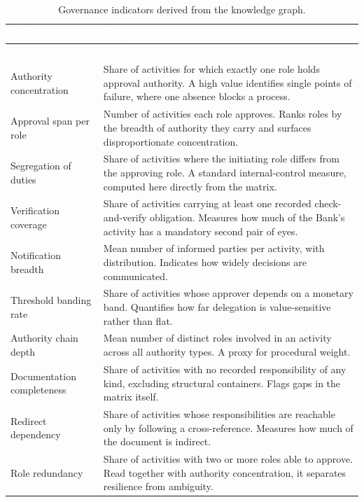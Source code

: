 \begin{longtable}{|p{}|p{}|}
\caption{Governance indicators derived from the knowledge graph.}\label{tab:govkpi}\\
\hline
\rowcolor{myblue}\textcolor{white}{\textbf{Indicator}} & \textcolor{white}{\textbf{Definition and interpretation}} \\
\hline
\endfirsthead
\hline
\rowcolor{myblue}\textcolor{white}{\textbf{Indicator}} & \textcolor{white}{\textbf{Definition and interpretation}} \\
\hline
\endhead
Authority concentration & Share of activities for which exactly one role holds approval authority. A high value identifies single points of failure, where one absence blocks a process. \\ \hline
Approval span per role & Number of activities each role approves. Ranks roles by the breadth of authority they carry and surfaces disproportionate concentration. \\ \hline
Segregation of duties & Share of activities where the initiating role differs from the approving role. A standard internal-control measure, computed here directly from the matrix. \\ \hline
Verification coverage & Share of activities carrying at least one recorded check-and-verify obligation. Measures how much of the Bank's activity has a mandatory second pair of eyes. \\ \hline
Notification breadth & Mean number of informed parties per activity, with distribution. Indicates how widely decisions are communicated. \\ \hline
Threshold banding rate & Share of activities whose approver depends on a monetary band. Quantifies how far delegation is value-sensitive rather than flat. \\ \hline
Authority chain depth & Mean number of distinct roles involved in an activity across all authority types. A proxy for procedural weight. \\ \hline
Documentation completeness & Share of activities with no recorded responsibility of any kind, excluding structural containers. Flags gaps in the matrix itself. \\ \hline
Redirect dependency & Share of activities whose responsibilities are reachable only by following a cross-reference. Measures how much of the document is indirect. \\ \hline
Role redundancy & Share of activities with two or more roles able to approve. Read together with authority concentration, it separates resilience from ambiguity. \\ \hline
\end{longtable}

